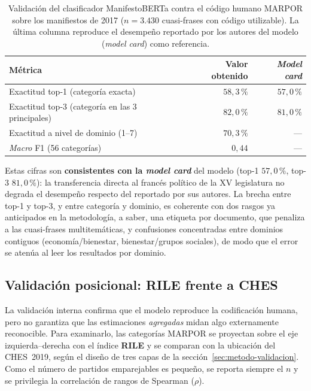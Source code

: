\begin{table}[H]
\centering
\caption{Validación del clasificador ManifestoBERTa contra el código humano
MARPOR sobre los manifiestos de 2017
($n = 3.430$ cuasi-frases con código utilizable). La última columna reproduce el
desempeño reportado por los autores del modelo (\emph{model card}) como
referencia.}
\label{tab:val-clasificador}
\begin{tabular}{@{}l r r@{}}
\toprule
\textbf{Métrica} & \textbf{Valor obtenido} & \textbf{\emph{Model card}} \\
\midrule
Exactitud top-1 (categoría exacta) & $58{,}3\,\%$ & $57{,}0\,\%$ \\
Exactitud top-3 (categoría en las 3 principales) & $82{,}0\,\%$ & $81{,}0\,\%$ \\
Exactitud a nivel de dominio (1--7) & $70{,}3\,\%$ & --- \\
\emph{Macro} F1 (56 categorías) & $0{,}44$ & --- \\
\bottomrule
\end{tabular}
\end{table}

Estas cifras son \textbf{consistentes con la \emph{model card}} del modelo
(top-1 $57{,}0\,\%$, top-3 $81{,}0\,\%$): la transferencia directa al francés
político de la XV legislatura no degrada el desempeño respecto del reportado por
sus autores. La brecha entre top-1 y top-3, y entre categoría y dominio, es
coherente con dos rasgos ya anticipados en la metodología, a saber, una etiqueta por
documento, que penaliza a las cuasi-frases multitemáticas, y confusiones
concentradas entre dominios contiguos (economía/bienestar, bienestar/grupos
sociales), de modo que el error se atenúa al leer los resultados por dominio.

\subsection{Validación posicional: RILE frente a CHES}
\label{sec:res-val-ches}

La validación interna confirma que el modelo reproduce la codificación humana,
pero no garantiza que las estimaciones \emph{agregadas} midan algo externamente
reconocible. Para examinarlo, las categorías MARPOR se proyectan sobre el eje
izquierda--derecha con el índice \textbf{RILE} \cite{laver1992party} y se
comparan con la ubicación del CHES~2019, según el diseño de tres capas de la
sección~\ref{sec:metodo-validacion}. Como el número de partidos emparejables es
pequeño, se reporta siempre el $n$ y se privilegia la correlación de rangos de
Spearman ($\rho$).

